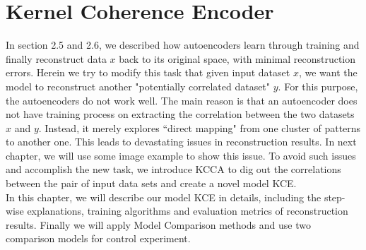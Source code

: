 \documentclass[12pt]{report} %
\begin{document}
\chapter{Kernel Coherence Encoder}
In section 2.5 and 2.6, we described how autoencoders learn through training and finally reconstruct data $x$ back to its original space, with minimal reconstruction errors. Herein we try to modify this task that given input dataset $x$, we want the model to reconstruct another "potentially correlated dataset" $y$. For this purpose, the autoencoders do not work well. The main reason is that an autoencoder does not have training process on extracting the correlation between the two datasets $x$ and $y$. Instead, it merely explores ``direct mapping" from one cluster of patterns to another one. This leads to devastating issues in reconstruction results. In next chapter, we will use some image example to show this issue. To avoid such issues and accomplish the new task, we introduce KCCA to dig out the correlations between the pair of input data sets and create a novel model KCE.  \\
In this chapter, we will describe our model KCE in details, including the step-wise explanations, training algorithms and evaluation metrics of reconstruction results. Finally we will apply Model Comparison\cite{MC} methods and use two comparison models for control experiment.
\end{document}

